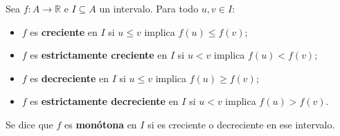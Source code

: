 \begin{definicion}
Sea $f:A\to\mathbb{R}$ e $I\subseteq A$ un intervalo. Para todo $u,v\in I$:
\begin{itemize}
  \item $f$ es \textbf{creciente} en $I$ si $u\leq v$ implica $f(u)\leq f(v)$;
  \item $f$ es \textbf{estrictamente creciente} en $I$ si $u<v$ implica $f(u)<f(v)$;
  \item $f$ es \textbf{decreciente} en $I$ si $u\leq v$ implica $f(u)\geq f(v)$;
  \item $f$ es \textbf{estrictamente decreciente} en $I$ si $u<v$ implica $f(u)>f(v)$.
\end{itemize}
Se dice que $f$ es \textbf{monótona} en $I$ si es creciente o decreciente en ese intervalo.


\end{definicion}
